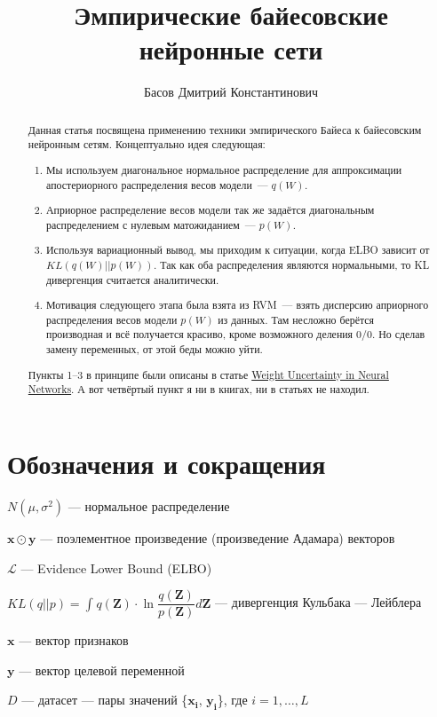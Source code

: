 \documentclass{article}
\title{Эмпирические байесовские нейронные сети}
\author{Басов Дмитрий Константинович}
\date{}
\begin{document}
\maketitle

\begin{abstract}

Данная статья посвящена применению техники эмпирического Байеса к байесовским нейронным сетям. Концептуально идея следующая:
\begin{enumerate}
 \item Мы используем диагональное нормальное распределение для аппроксимации апостериорного распределения весов модели~--- $q(W)$.
 \item Априорное распределение весов модели так же задаётся диагональным распределением с нулевым матожиданием~--- $p(W)$.
 \item Используя вариационный вывод, мы приходим к ситуации, когда ELBO зависит от $KL(q(W) || p(W))$. Так как оба распределения являются нормальными, то KL дивергенция считается аналитически.
 \item Мотивация следующего этапа была взята из RVM~--- взять дисперсию априорного распределения весов модели $p(W)$ из данных. Там несложно берётся производная и всё получается красиво, кроме возможного деления 0/0. Но сделав замену переменных, от этой беды можно уйти.
\end{enumerate}
Пункты 1--3 в принципе были описаны в статье \href{https://arxiv.org/pdf/1505.05424}{Weight Uncertainty in Neural Networks}. А вот четвёртый пункт я ни в книгах, ни в статьях не находил.

\end{abstract}


\section{Обозначения и сокращения}
$N(\mu, \sigma^2)$ --- нормальное распределение

$\mathbf{x} \odot \mathbf{y}$ --- поэлементное произведение (произведение Адамара) векторов

$\mathcal{L}$ --- Evidence Lower Bound (ELBO)

$KL(q || p) = \int_{}{} q(\mathbf{Z}) \cdot \ln{\dfrac{q(\mathbf{Z})}{p(\mathbf{Z})}} d\mathbf{Z}$ --- дивергенция Кульбака --- Лейблера

$\mathbf{x}$ --- вектор признаков

$\mathbf{y}$ --- вектор целевой переменной

$D$ --- датасет --- пары значений \{$\mathbf{x_i}$, $\mathbf{y_i}$\}, где $i = 1, \dots, L$
\end{document}
